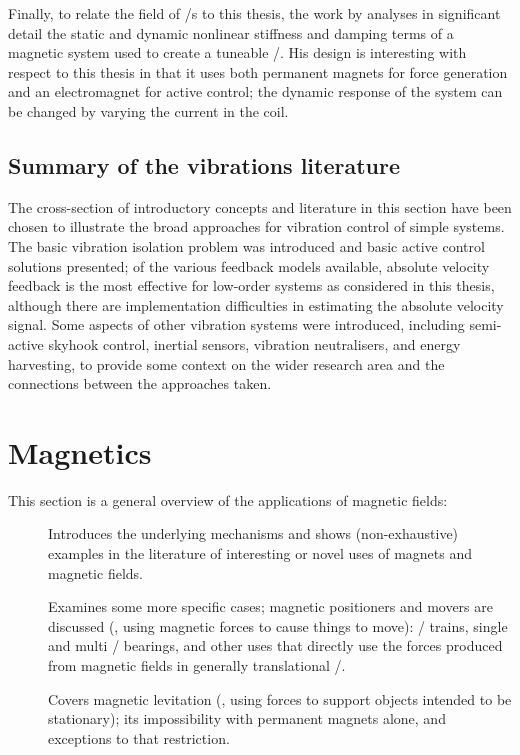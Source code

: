 \documentclass[11pt,a4paper]{memoir}
\begin{document}
Finally, to relate the field of \vibneut/s to this thesis, the work by \textcite{tentor2001} analyses in significant detail the static and dynamic nonlinear stiffness and damping terms of a magnetic system used to create a tuneable \vibneut/.
His design is interesting with respect to this thesis in that it uses both permanent magnets for force generation and an electromagnet for active control; the dynamic response of the system can be changed by varying the current in the coil.



\subsection{Summary of the vibrations literature}

The cross-section of introductory concepts and literature in this section have been chosen to illustrate the broad approaches for vibration control of simple systems.
The basic vibration isolation problem was introduced and basic active control solutions presented; of the various feedback models available, absolute velocity feedback is the most effective for low-order systems as considered in this thesis, although there are implementation difficulties in estimating the absolute velocity signal.
Some aspects of other vibration systems were introduced, including semi-active skyhook control, inertial sensors, vibration neutralisers, and energy harvesting, to provide some context on the wider research area and the connections between the approaches taken.


\section{Magnetics}


This section is a general overview of the applications of magnetic fields:
\begin{description}
\item[]
Introduces the underlying mechanisms and shows (non-exhaustive) examples in the literature of interesting or novel uses of magnets and magnetic fields.
\item[]
Examines some more specific cases; magnetic positioners and movers are discussed (\ie, using magnetic forces to cause things to move): \maglev/ trains, single and multi \dof/ bearings, and other uses that directly use the forces produced from magnetic fields in generally translational \dofs/.
\item[] Covers magnetic levitation (\ie, using forces to support objects intended to be stationary); its impossibility with permanent magnets alone, and exceptions to that restriction.
\end{description}
\end{document}
